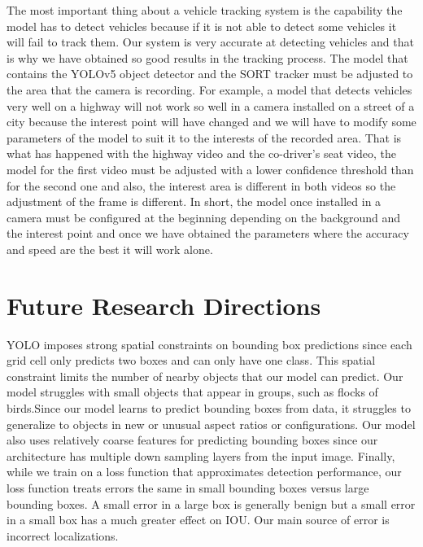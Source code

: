 The  most  important  thing  about  a  vehicle  tracking  system  is  the  capability  the  model  has  to 
detect  vehicles  because  if  it  is  not  able  to  detect  some  vehicles  it  will  fail  to  track  them.  Our 
system is very accurate at detecting vehicles and that is why we have obtained so good results 
in  the  tracking  process.  The  model  that  contains  the  YOLOv5  object  detector  and  the  SORT 
tracker must be adjusted to the area that the camera is recording. For example, a model that 
detects vehicles very well on a highway will not work so well in a camera installed on a street of 
a city because the interest point will have changed and we will have to modify some parameters 
of the model to suit it to the interests of the recorded area. That is what has happened with the 
highway video and the co-driver’s seat video, the model for the first video must be adjusted with 
a lower confidence threshold than for the second one and also, the interest area is different in 
both videos so the adjustment of the frame is different. In short, the model once installed in a 
camera  must  be  configured  at  the  beginning  depending  on  the  background  and  the  interest 
point and once we have obtained the parameters where the accuracy and speed are the best it 
will work alone. 


\section{Future Research Directions}
YOLO imposes strong spatial constraints on bounding box predictions since each grid cell only predicts two boxes and can only have one class. This spatial constraint limits the number of nearby objects that our model can predict. Our model struggles with small objects that appear in groups, such as flocks of birds.Since our model learns to predict bounding boxes from data, it struggles to generalize to objects in new or unusual aspect ratios or configurations. Our model also uses relatively coarse features for predicting bounding boxes since our architecture has multiple down sampling layers from the input image. Finally, while we train on a loss function that approximates detection performance, our loss function treats errors the same in small bounding boxes versus large bounding boxes. A small error in a large box is generally benign but a small error in a small box has a much greater effect on IOU. Our main source of error is incorrect localizations.
